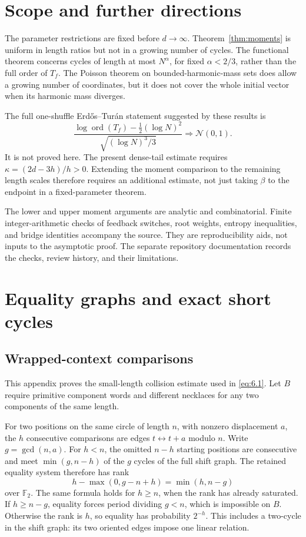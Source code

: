 \documentclass[11pt]{article}
\theoremstyle{remark}
\begin{document}
\section{Scope and further directions}\label{sec:scope}
The parameter restrictions are fixed before $d\to\infty$.
Theorem~\ref{thm:moments} is uniform in length ratios but not in a growing
number of cycles. The functional theorem concerns cycles of length at most
$N^\alpha$, for fixed $\alpha<2/3$, rather than the full order of $T_f$.
The Poisson theorem on bounded-harmonic-mass sets does allow a growing number
of coordinates, but it does not cover the whole initial vector when its
harmonic mass diverges.

The full one-shuffle Erd\H{o}s--Tur\'{a}n statement suggested by these
results is
\[
 \frac{\log\operatorname{ord}(T_f)-\tfrac12(\log N)^2}
 {\sqrt{(\log N)^3/3}}
 \Longrightarrow\mathcal N(0,1).
\]
It is not proved here. The present dense-tail estimate requires
$\kappa=(2d-3h)/h>0$. Extending the moment comparison to the remaining
length scales therefore requires an additional estimate, not just taking
$\beta$ to the endpoint in a fixed-parameter theorem.

The lower and upper moment arguments are analytic and combinatorial.
Finite integer-arithmetic checks of feedback switches, root weights,
entropy inequalities, and bridge identities accompany the source. They
are reproducibility aids, not inputs to the asymptotic proof. The separate
repository documentation records the checks, review history, and their
limitations.

\appendix
\section{Equality graphs and exact short cycles}\label{app:contexts}
\subsection{Wrapped-context comparisons}

This appendix proves the small-length collision estimate used in \eqref{eq:6.1}.
Let \(B\) require primitive component words and different necklaces for
any two components of the same length.

For two positions on the same circle of length \(n\), with nonzero
displacement \(a\), the \(h\) consecutive comparisons are edges
\(t\leftrightarrow t+a\) modulo \(n\). Write \(g=\gcd(n,a)\). For
\(h<n\), the omitted \(n-h\) starting positions are consecutive and meet
\(\min(g,n-h)\) of the \(g\) cycles of the full shift graph. The
retained equality system therefore has rank \[
 h-\max(0,g-n+h)=\min(h,n-g)
\] over \(\mathbb F_2\). The same formula holds for \(h\ge n\), when the
rank has already saturated. If \(h\ge n-g\), equality forces period
dividing \(g<n\), which is impossible on \(B\). Otherwise the rank is
\(h\), so equality has probability \(2^{-h}\). This includes a two-cycle
in the shift graph: its two oriented edges impose one linear relation.
\end{document}
